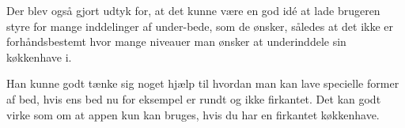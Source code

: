 Der blev også gjort udtyk for, at det kunne være en god idé at lade brugeren styre for mange inddelinger af under-bede, som de ønsker, således at det ikke er forhåndsbestemt hvor mange niveauer man ønsker at underinddele sin køkkenhave i.

Han kunne godt tænke sig noget hjælp til hvordan man kan lave specielle former af bed, hvis ens bed nu for eksempel er rundt og ikke firkantet. Det kan godt virke som om at appen kun kan bruges, hvis du har en firkantet køkkenhave.
